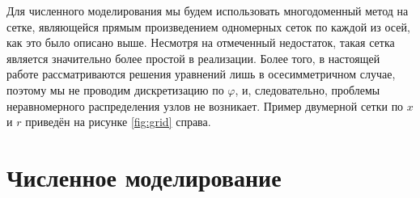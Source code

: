 \documentclass[12pt, a4paper]{report}
\begin{document}
Для численного моделирования мы будем использовать многодоменный метод на сетке, являющейся прямым произведением одномерных сеток по каждой из осей, как это было описано выше. Несмотря на отмеченный недостаток, такая сетка является значительно более простой в реализации. Более того, в настоящей работе рассматриваются решения уравнений лишь в осесимметричном случае, поэтому мы не проводим дискретизацию по $\varphi$, и, следовательно, проблемы неравномерного распределения узлов не возникает. Пример двумерной сетки по $x$ и $r$ приведён на рисунке \ref{fig:grid} справа.






\section{Численное моделирование}

\end{document}
